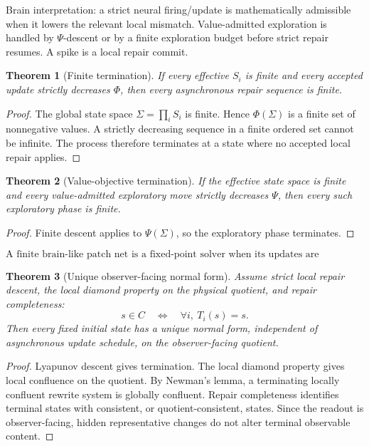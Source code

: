 \documentclass[11pt]{article}
\newtheorem{theorem}{Theorem}[section]
\theoremstyle{remark}
\theoremstyle{plain}
\begin{document}
Brain interpretation: a strict neural firing/update is mathematically admissible when it lowers the relevant local mismatch. Value-admitted exploration is handled by \(\Psi\)-descent or by a finite exploration budget before strict repair resumes. A spike is a local repair commit.

\begin{theorem}[Finite termination]
If every effective \(S_i\) is finite and every accepted update strictly decreases \(\Phi\), then every asynchronous repair sequence is finite.
\end{theorem}

\begin{proof}
The global state space \(\Sigma=\prod_i S_i\) is finite. Hence \(\Phi(\Sigma)\) is a finite set of nonnegative values. A strictly decreasing sequence in a finite ordered set cannot be infinite. The process therefore terminates at a state where no accepted local repair applies.
\end{proof}

\begin{theorem}[Value-objective termination]
If the effective state space is finite and every value-admitted exploratory move strictly decreases \(\Psi\), then every such exploratory phase is finite.
\end{theorem}

\begin{proof}
Finite descent applies to \(\Psi(\Sigma)\), so the exploratory phase terminates.
\end{proof}

\[
\boxed{
\text{A finite brain-like patch net is a fixed-point solver when its updates are mismatch-decreasing.}
}
\]

\begin{theorem}[Unique observer-facing normal form]
Assume strict local repair descent, the local diamond property on the physical quotient, and repair completeness:
\[
s\in C
\quad\Longleftrightarrow\quad
\forall i,\ T_i(s)=s.
\]
Then every fixed initial state has a unique normal form, independent of asynchronous update
schedule, on the observer-facing quotient.
\end{theorem}

\begin{proof}
Lyapunov descent gives termination. The local diamond property gives local confluence on the quotient. By Newman's lemma, a terminating locally confluent rewrite system is globally confluent. Repair completeness identifies terminal states with consistent, or quotient-consistent, states. Since the readout is observer-facing, hidden representative changes do not alter terminal observable content.
\end{proof}
\end{document}
